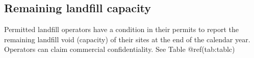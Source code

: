 \documentclass[
]{article}
\begin{document}
\hypertarget{remaining-landfill-capacity}{%
\subsection{Remaining landfill
capacity}\label{remaining-landfill-capacity}}

Permitted landfill operators have a condition in their permits to report
the remaining landfill void (capacity) of their sites at the end of the
calendar year. Operators can claim commercial confidentiality. See Table
@ref(tab:tablc)

\providecommand{\docline}[3]{\noalign{\global\setlength{\arrayrulewidth}{#1}}\arrayrulecolor[HTML]{#2}\cline{#3}}

\setlength{\tabcolsep}{0pt}

\renewcommand*{\arraystretch}{1.5}
\end{document}
